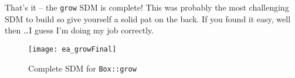 \begin{stepbystep}
\item  That's it -- the \texttt{grow} SDM is complete! This was probably the most challenging SDM to build so give yourself a solid 
pat on the back. If you found it easy, well then \ldots I guess I'm doing my job correctly.

\vspace{0.5cm}

\begin{figure}[htbp]
\begin{center}
  \texttt{[image: ea\_growFinal]}
  \caption{Complete SDM for \texttt{Box::grow}}  
  \label{ea:growComplete}
\end{center}
\end{figure}
\FloatBarrier

\end{stepbystep}
